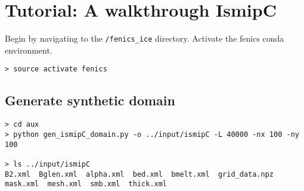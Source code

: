 \documentclass[11pt, reqno, nocenter]{article}
\begin{document}
\section{Tutorial: A walkthrough IsmipC}

Begin by navigating to the {\tt /fenics\_ice} directory. Activate the fenics conda environment.

\begin{verbatim}
> source activate fenics 
\end{verbatim}


\subsection{Generate synthetic domain}


\begin{verbatim}
> cd aux 
> python gen_ismipC_domain.py -o ../input/ismipC -L 40000 -nx 100 -ny 100 

> ls ../input/ismipC
B2.xml  Bglen.xml  alpha.xml  bed.xml  bmelt.xml  grid_data.npz  mask.xml  mesh.xml  smb.xml  thick.xml 
\end{verbatim}
\end{document}
